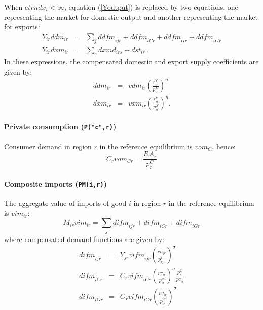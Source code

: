 When $\textit{etrndx}_{i}<\infty$, equation (\ref{Youtput}) is replaced by two equations, one representing the market for domestic output and another representing the market for exports:
\begin{eqnarray}
Y_{ir} \textit{ddm}_{ir} &=&
\sum_j \textit{ddfm}_{ijr} + \textit{ddfm}_{iCr} + \textit{ddfm}_{iIr}
+ \textit{ddfm}_{iGr} \label{Doutput}\\
Y_{ir} \textit{dxm}_{ir} &=&
\sum_s \textit{dxmd}_{irs} + \textit{dst}_{ir}
\,.\label{Xoutput}
\end{eqnarray}
In these expressions, the compensated domestic and export supply coefficients are given by:
\begin{eqnarray}
\textit{ddm}_{ir} &=& \textit{vdm}_{ir} \left( \frac{ r^Y_{ir} } {
p^D_{ir}} \right)^{\eta} \nonumber \\
\textit{dxm}_{ir} &=& \textit{vxm}_{ir} \left( \frac{ r^Y_{ir} } {
p^X_{ir}} \right)^{\eta}. \nonumber
\end{eqnarray}

\paragraph{\bf Private consumption (\texttt{P("c",r)})}

Consumer demand in region $r$ in the reference equilibrium is $\textit{vom}_{Cr}$ hence:
\begin{equation}
C_r \textit{vom}_{Cr}  = \frac{\textit{RA}_r}{p^C_r}
\end{equation}

\paragraph{\bf Composite imports (\texttt{PM(i,r)})}

The aggregate value of imports of good $i$ in region $r$ in the reference equilibrium is $\textit{vim}_{ir}$:
\begin{equation}
M_{ir} \textit{vim}_{ir} = \sum_j \textit{difm}_{ijr} +
\textit{difm}_{iCr} + \textit{difm}_{iGr}
\end{equation}
where compensated demand functions are given by:
\begin{eqnarray}
\textit{difm}_{ijr} &=& Y_{jr} \textit{vifm}_{ijr} \left( \frac{ci_{ijr}}{p^i_{ijr}} \right)^\sigma\nonumber\\
\textit{difm}_{iCr} &=& C_r \textit{vifm}_{iCr}  \left(\frac{pc_{ir}}{p^{ic}_{ir}}\right)^\sigma  \frac{p^C_r}{\textit{pc}_{ir}} \nonumber\\
\textit{difm}_{iGr} &=& G_r \textit{vifm}_{iGr} \left(\frac{pg_{ir}}{p^{ig}_{ir}}\right)^\sigma \nonumber
\end{eqnarray}

